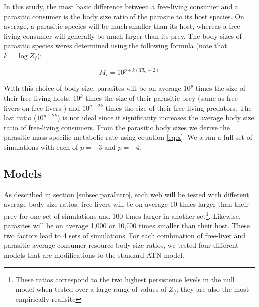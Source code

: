 \documentclass[11pt]{amsart}
\begin{document}
 In this study, the most basic difference between a free-living consumer and a parasitic consumer is the body size ratio of the parasite to its host species.  On average, a parasitic species will be much smaller than its host, whereas a free-living consumer will generally be much larger than its prey.  The body sizes of parasitic species weres determined using the following formula (note that $k = \log Z_f$):

\begin{equation}
M_i = 10^{p + k(TL_i -2)} \label{eq:Mpara}
\end{equation}

With this choice of body size, parasites will be on average $10^{p}$ times the size of their free-living hosts, $10^k$ times the size of their parasitic prey (same as free-livers on free livers ) and $10^{p-2k}$ times the size of their free-living predators.  The last ratio ($10^{p-2k}$) is not ideal since it significanty increases the average body size ratio of free-living consumers.  From the parasitic body sizes we derive the parasitic mass-specific metabolic rate using equation \ref{eq:x}.  We a ran a full set of simulations with each of $p=-3$ and $p=-4$.

\subsection{Models\label{subsec:models}}

As described in section \ref{subsec:paraIntro}, each web will be tested with different average body size ratios: free livers will be on average 10 times larger than their prey for one set of simulations and 100 times larger in another set\footnote{These ratios correspond to the two highest persistence levels in the null model when tested over a large range of values of $Z_f$; they are also the most empirically realisitc}.  Likewise, parasites will be on average 1,000 or 10,000 times smaller than their host.  These two factors lead to 4 sets of simulations.  For each combination of free-liver and parasitic average consumer-resource body size ratios, we tested four different models that are modifications to the standard ATN model.
\end{document}
